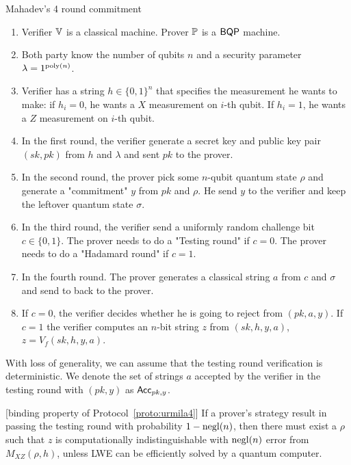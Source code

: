 \begin{protocol}{Mahadev's 4 round commitment}
\label{proto:urmila4}
\begin{enumerate}
    \item Verifier $\mathbb{V}$ is a classical machine. Prover $\mathbb{P}$ is a $\operatorname{\mathsf{BQP}}$ machine. 
    \item Both party know the number of qubits $n$ and a security parameter $\lambda=1^{\operatorname*{\operatorname{poly}}(n)}$.
    \item Verifier has a string $h \in \{0,1\}^n$ that specifies the measurement he wants to make: if $h_i=0$, he wants a $X$ measurement on $i$-th qubit. If $h_i=1$, he wants a $Z$ measurement on $i$-th qubit.  
    \item In the first round, the verifier generate a secret key and  public key pair $(sk,pk)$ from $h$ and $\lambda$ and sent $pk$ to the prover.
    \item In the second round, the prover pick some $n$-qubit quantum state $\rho$ and generate a "commitment" $y$ from $pk$ and $\rho$. He send $y$ to the verifier and keep the leftover quantum state $\sigma$.
    \item In the third round, the verifier send a uniformly random challenge bit $c\in \{0,1\}$. The prover needs to do a "Testing round" if $c=0$. The prover needs to do a "Hadamard round" if $c=1$.
    \item In the fourth round. The prover generates a classical string $a$ from $c$ and $\sigma$ and send to back to the prover.
    \item If $c=0$, the verifier decides whether he is going to reject from $(pk,a,y)$. If $c=1$ the verifier computes an $n$-bit string $z$ from $(sk,h,y,a)$, $z=V_f(sk,h,y,a)$.
\end{enumerate}
\end{protocol}

\begin{definition}
With loss of generality,  we can assume that the testing round verification is deterministic. We denote the set of strings $a$ accepted by the verifier in the testing round with $(pk,y)$ as $\mathsf{Acc}_{pk,y}$.
\end{definition}

\begin{lemma}\label{lem:urmila-binding}[binding property of  Protocol~\ref{proto:urmila4}\cite{FOCS:Mahadev18a}]
If a prover's strategy result in passing the testing round with probability $1-\operatorname{negl}(n)$, then there must exist a $\rho$ such that $z$ is computationally indistinguishable with $\operatorname{negl}(n)$ error  from $M_{XZ}(\rho,h)$, unless LWE can be efficiently solved by a quantum computer. 
\end{lemma}


